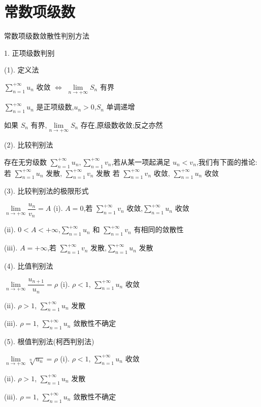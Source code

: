 \section{常数项级数}

常数项级数敛散性判别方法

1. 正项级数判别

(1). 定义法\label{定义法}
\begin{theorem}[收敛原则]\label{the: 正向级数敛散性的判别方法}
	$\sum\limits_{n=1}^{+\infty}u_{n}$ 收敛 $\Leftrightarrow$ $\lim\limits_{n\rightarrow +\infty}S_{n}$ 有界
\end{theorem}
\begin{anymark}[证明]
	$\sum\limits_{n=1}^{+\infty}u_{n}$ 是正项级数,$u_{n}>0$,$S_{n}$ 单调递增

	如果 $S_{n}$ 有界,$\lim\limits_{n\rightarrow+\infty}S_{n}$ 存在,原级数收敛;反之亦然
\end{anymark}
(2). 比较判别法
\begin{theorem}
	存在无穷级数 $\sum\limits_{n=1}^{+\infty}u_{n},\sum\limits_{n=1}^{+\infty}v_{n}$,若从某一项起满足 $u_{n}<v_{n}$,我们有下面的推论:
	若 $\sum\limits_{n=1}^{+\infty}u_{n}$ 发散, $\sum\limits_{n=1}^{+\infty}v_{n}$ 发散
	若 $\sum\limits_{n=1}^{+\infty}v_{n}$ 收敛, $\sum\limits_{n=1}^{+\infty}u_{n}$ 收敛
\end{theorem}
(3). 比较判别法的极限形式
\begin{theorem}\label{the: 比较判别法的极限形式}
	$\lim\limits_{n\rightarrow+\infty}\dfrac{u_{n}}{v_{n}}=A$
	(i). $A=0$,若 $\sum\limits_{n=1}^{+\infty}v_{n}$ 收敛,$\sum\limits_{n=1}^{+\infty}u_{n}$ 收敛

	(ii). $0<A<+\infty$,$\sum\limits_{n=1}^{+\infty}u_{n}$ 和 $\sum\limits_{n=1}^{+\infty}v_{n}$ 有相同的敛散性

	(iii). $A=+\infty$,若 $\sum\limits_{n=1}^{+\infty}v_{n}$ 发散,$\sum\limits_{n=1}^{+\infty}u_{n}$ 发散
\end{theorem}
(4). 比值判别法
\begin{theorem}
	$\lim\limits_{n\rightarrow+\infty}\dfrac{u_{n+1}}{u_{n}}=\rho$
	(i). $\rho<1$, $\sum\limits_{n=1}^{+\infty}u_{n}$ 收敛

	(ii). $\rho>1$, $\sum\limits_{n=1}^{+\infty}u_{n}$ 发散

	(iii). $\rho=1$, $\sum\limits_{n=1}^{+\infty}u_{n}$ 敛散性不确定
\end{theorem}
(5). 根值判别法(柯西判别法)
\begin{theorem}
	$\lim\limits_{n\rightarrow+\infty}\sqrt[n]{u_{n}}=\rho$
	(i). $\rho<1$, $\sum\limits_{n=1}^{+\infty}u_{n}$ 收敛

	(ii). $\rho>1$, $\sum\limits_{n=1}^{+\infty}u_{n}$ 发散

	(iii). $\rho=1$, $\sum\limits_{n=1}^{+\infty}u_{n}$ 敛散性不确定
\end{theorem}
